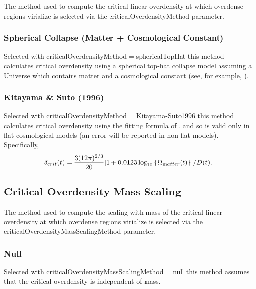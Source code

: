 The method used to compute the critical linear overdensity at which overdense regions virialize is selected via the {\normalfont \ttfamily criticalOverdensityMethod} parameter.

\subsubsection{Spherical Collapse (Matter + Cosmological Constant)}

Selected with {\normalfont \ttfamily criticalOverdensityMethod}$=${\normalfont \ttfamily sphericalTopHat} this method calculates critical overdensity using a spherical top-hat collapse model assuming a Universe which contains matter and a cosmological constant (see, for example, \citealt{percival_cosmological_2005}).

\subsubsection{Kitayama \& Suto (1996)}

Selected with {\normalfont \ttfamily criticalOverdensityMethod}$=${\normalfont \ttfamily Kitayama-Suto1996} this method calculates critical overdensity using the fitting formula of \cite{kitayama_semianalytic_1996}, and so is valid only in flat cosmological models (an error will be reported in non-flat models). Specifically,
\begin{equation}
 \delta_{\mathrm crit} (t) = {3 (12 \pi)^{2/3} \over 20} [1 + 0.0123 \log_{10}\left\{\Omega_{\mathrm matter}(t)\right\}]/D(t).
\end{equation}

\subsection{Critical Overdensity Mass Scaling}

The method used to compute the scaling with mass of the critical linear overdensity at which overdense regions virialize is selected via the {\normalfont \ttfamily criticalOverdensityMassScalingMethod} parameter.

\subsubsection{Null}

Selected with {\normalfont \ttfamily criticalOverdensityMassScalingMethod}$=${\normalfont \ttfamily null} this method assumes that the critical overdensity is independent of mass.

